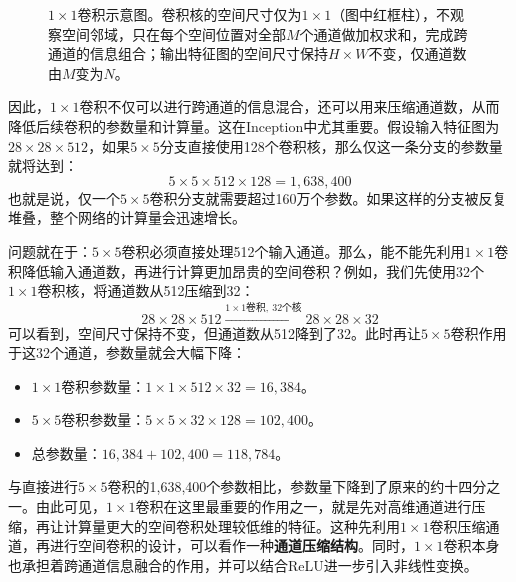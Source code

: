 \begin{figure}[H]
    \caption{$1\times 1$卷积示意图。卷积核的空间尺寸仅为$1\times 1$（图中红框柱），不观察空间邻域，只在每个空间位置对全部$M$个通道做加权求和，完成跨通道的信息组合；输出特征图的空间尺寸保持$H\times W$不变，仅通道数由$M$变为$N$。}
    \label{fig:11_convolution}
\end{figure}

因此，$1\times1$卷积不仅可以进行跨通道的信息混合，还可以用来压缩通道数，从而降低后续卷积的参数量和计算量。这在Inception中尤其重要。假设输入特征图为$28\times28\times512$，如果$5\times5$分支直接使用128个卷积核，那么仅这一条分支的参数量就将达到：
$$
5\times5\times512\times128=1,638,400
$$
也就是说，仅一个$5\times5$卷积分支就需要超过160万个参数。如果这样的分支被反复堆叠，整个网络的计算量会迅速增长。

问题就在于：$5\times5$卷积必须直接处理512个输入通道。那么，能不能先利用$1\times1$卷积降低输入通道数，再进行计算更加昂贵的空间卷积？例如，我们先使用32个$1\times1$卷积核，将通道数从512压缩到32：
$$
28\times28\times512
\xrightarrow{1\times1\text{卷积},\ 32\text{个核}}
28\times28\times32
$$
可以看到，空间尺寸保持不变，但通道数从512降到了32。此时再让$5\times5$卷积作用于这32个通道，参数量就会大幅下降：
\begin{itemize}
    \item $1\times1$卷积参数量：$1\times1\times512\times32=16,384$。
    \item $5\times5$卷积参数量：$5\times5\times32\times128=102,400$。
    \item 总参数量：$16,384+102,400=118,784$。
\end{itemize}
与直接进行$5\times5$卷积的1,638,400个参数相比，参数量下降到了原来的约十四分之一。由此可见，$1\times1$卷积在这里最重要的作用之一，就是先对高维通道进行压缩，再让计算量更大的空间卷积处理较低维的特征。这种先利用$1\times1$卷积压缩通道，再进行空间卷积的设计，可以看作一种\textbf{通道压缩结构}。同时，$1\times1$卷积本身也承担着跨通道信息融合的作用，并可以结合ReLU进一步引入非线性变换。

